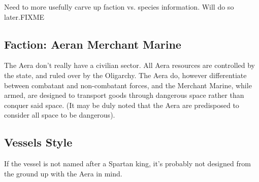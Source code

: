 Need to more usefully carve up faction vs. species information. Will
do so later.FIXME

\subsection{Faction: Aeran Merchant Marine}


The Aera don't really have a civilian sector. All Aera resources are
controlled by the state, and ruled over by the Oligarchy. The Aera do,
however differentiate between combatant and non-combatant forces, and
the Merchant Marine, while armed, are designed to transport goods
through dangerous space rather than conquer said space. (It may be
duly noted that the Aera are predisposed to consider all space to be
dangerous).

\subsection{Vessels Style}

If the vessel is not named after a Spartan king, it's probably not designed from the ground up with the Aera in mind.

